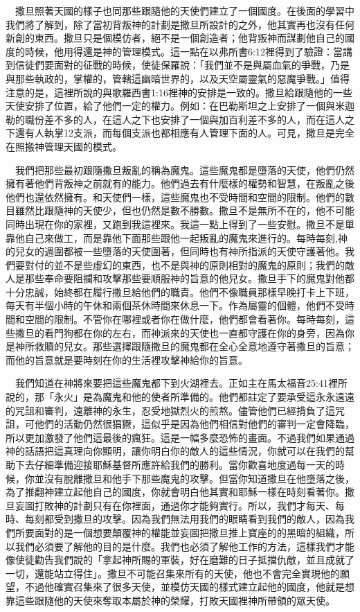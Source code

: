 \documentclass{book}
\begin{document}
　撒旦照著天國的樣子也同那些跟隨他的天使們建立了一個國度。在後面的學習中我們將了解到，除了當初背叛神的計劃是撒旦所設計的之外，他其實再也沒有任何新創的東西。撒旦只是個模仿者，絕不是一個創造者；他背叛神而謀劃他自己的國度的時候，他用得還是神的管理模式。這一點在以弗所書6:12裡得到了驗證：當講到信徒們要面對的征戰的時候，使徒保羅說：「我們並不是與屬血氣的爭戰，乃是與那些執政的，掌權的，管轄這幽暗世界的，以及天空屬靈氣的惡魔爭戰。」值得注意的是，這裡所說的與歌羅西書1:16裡神的安排是一致的。撒旦給跟隨他的一些天使安排了位置，給了他們一定的權力。例如：在巴勒斯坦之上安排了一個與米迦勒的職份差不多的人，在這人之下也安排了一個與加百利差不多的人，而在這人之下還有人執掌12支派，而每個支派也都相應有人管理下面的人。可見，撒旦是完全在照搬神管理天國的模式。

　我們把那些最初跟隨撒旦叛亂的稱為魔鬼。這些魔鬼都是墮落的天使，他們仍然擁有著他們背叛神之前就有的能力。他們過去有什麼樣的權勢和智慧，在叛亂之後他們也還依然擁有。和天使們一樣，這些魔鬼也不受時間和空間的限制。他們的數目雖然比跟隨神的天使少，但也仍然是數不勝數。撒旦不是無所不在的，他不可能同時出現在你的家裡，又跑到我這裡來。我這一點上得到了一些安慰。撒旦不是單靠他自己來做工，而是靠他下面那些跟他一起叛亂的魔鬼來進行的。每時每刻,神的兒女的週圍都被一些墮落的天使圍著，但同時也有神所指派的天使守護著他。我們要對付的並不是些虛幻的東西，也不是與神的原則相對的魔鬼的原則；我們的敵人是那些奉命要阻攔和攻擊那些要順服神的旨意的他兒女。撒旦手下的魔鬼對他都十分忠誠，始終都在履行撒旦給他們的職責。他們不像職員那樣早晚打卡上下班，每天有半個小時的午休和兩個茶休時間來休息一下。作為屬靈的個體，他們不受時間和空間的限制。不管你在哪裡或者你在做什麼，他們都會看著你。每時每刻，這些撒旦的看門狗都在你的左右，而神派來的天使也一直都守護在你的身旁，因為你是神所救贖的兒女。那些選擇跟隨撒旦的魔鬼都在全心全意地遵守著撒旦的旨意；而他的旨意就是要時刻在你的生活裡攻擊神給你的旨意。

　我們知道在神將來要把這些魔鬼都下到火湖裡去。正如主在馬太福音25:41裡所說的，那「永火」是為魔鬼和他的使者所準備的。他們都註定了要承受這永永遠遠的咒詛和審判，遠離神的永生，忍受地獄烈火的煎熬。儘管他們已經揹負了這咒詛，可他們的活動仍然很猖獗，這似乎是因為他們相信對他們的審判一定會降臨，所以更加激發了他們這最後的瘋狂。這是一幅多麼恐怖的畫面。不過我們如果通過神的話語把這真理向你顯明，讓你明白你的敵人的這些情況，你就可以在我們的幫助下去仔細準備迎接耶穌基督所應許給我們的勝利。當你歡喜地度過每一天的時候，你並沒有脫離撒旦和他手下那些魔鬼的攻擊。但當你知道撒旦在他墮落之後，為了推翻神建立起他自己的國度，你就會明白他其實和耶穌一樣在時刻看著你。撒旦妄圖打敗神的計劃只有在你裡面，通過你才能夠實行。所以，我們才每天、每時、每刻都受到撒旦的攻擊。因為我們無法用我們的眼睛看到我們的敵人，因為我們所要面對的是一個想要顛覆神的權能並妄圖把撒旦推上寶座的的黑暗的組織，所以我們必須要了解他的目的是什麼。我們也必須了解他工作的方法，這樣我們才能像使徒勸告我們說的「拿起神所賜的軍裝，好在磨難的日子抵擋仇敵，並且成就了一切，還能站立得住」。撒旦不可能召集來所有的天使，他也不會完全實現他的願望，不過他確實召集來了很多天使，並模仿天國的樣式建立起他的國度，他就是想靠這些跟隨他的天使來奪取本屬於神的榮耀，打敗天國裡神所帶領的眾天使。
\end{document}
